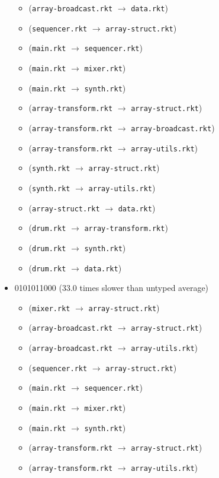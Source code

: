 \documentclass{article}
\newcommand{\mono}[1]{\texttt{#1}}
\begin{document}
\begin{itemize}
\begin{itemize}
  \item (\mono{array-broadcast.rkt} $\rightarrow$ \mono{data.rkt})
  \item (\mono{sequencer.rkt} $\rightarrow$ \mono{array-struct.rkt})
  \item (\mono{main.rkt} $\rightarrow$ \mono{sequencer.rkt})
  \item (\mono{main.rkt} $\rightarrow$ \mono{mixer.rkt})
  \item (\mono{main.rkt} $\rightarrow$ \mono{synth.rkt})
  \item (\mono{array-transform.rkt} $\rightarrow$ \mono{array-struct.rkt})
  \item (\mono{array-transform.rkt} $\rightarrow$ \mono{array-broadcast.rkt})
  \item (\mono{array-transform.rkt} $\rightarrow$ \mono{array-utils.rkt})
  \item (\mono{synth.rkt} $\rightarrow$ \mono{array-struct.rkt})
  \item (\mono{synth.rkt} $\rightarrow$ \mono{array-utils.rkt})
  \item (\mono{array-struct.rkt} $\rightarrow$ \mono{data.rkt})
  \item (\mono{drum.rkt} $\rightarrow$ \mono{array-transform.rkt})
  \item (\mono{drum.rkt} $\rightarrow$ \mono{synth.rkt})
  \item (\mono{drum.rkt} $\rightarrow$ \mono{data.rkt})
  \end{itemize}
\item 0101011000 (33.0 times slower than untyped average)
  \begin{itemize}
  \item (\mono{mixer.rkt} $\rightarrow$ \mono{array-struct.rkt})
  \item (\mono{array-broadcast.rkt} $\rightarrow$ \mono{array-struct.rkt})
  \item (\mono{array-broadcast.rkt} $\rightarrow$ \mono{array-utils.rkt})
  \item (\mono{sequencer.rkt} $\rightarrow$ \mono{array-struct.rkt})
  \item (\mono{main.rkt} $\rightarrow$ \mono{sequencer.rkt})
  \item (\mono{main.rkt} $\rightarrow$ \mono{mixer.rkt})
  \item (\mono{main.rkt} $\rightarrow$ \mono{synth.rkt})
  \item (\mono{array-transform.rkt} $\rightarrow$ \mono{array-struct.rkt})
  \item (\mono{array-transform.rkt} $\rightarrow$ \mono{array-utils.rkt})

\end{itemize}
\end{itemize}
\end{document}
